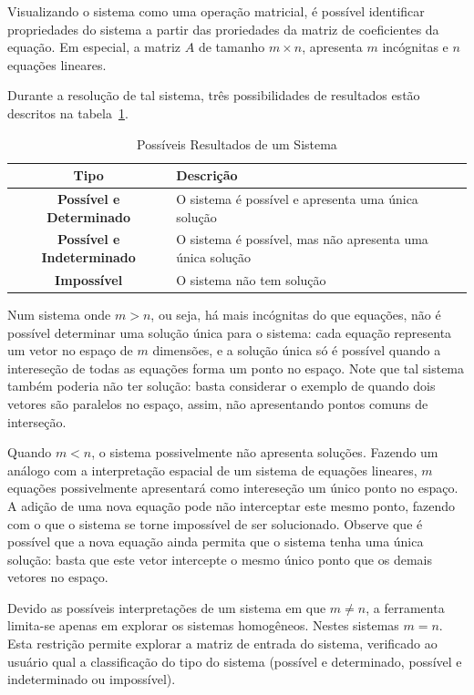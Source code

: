 \documentclass[a4paper,10pt]{report}
\begin{document}
Visualizando o sistema como uma operação matricial, é possível identificar propriedades do sistema a partir das proriedades da matriz de coeficientes da equação. Em especial, a matriz $A$ de tamanho $m \times n$, apresenta $m$ incógnitas e $n$ equações lineares.

Durante a resolução de tal sistema, três possibilidades de resultados estão descritos na tabela~\ref{tab:sistemas}.

\begin{table}[h]
\centering
\caption{Possíveis Resultados de um Sistema}
        \begin{tabular}{|c|p{2in}|}
        \hline
        \textbf{Tipo} & \textbf{Descrição} \\ \hline
        \textbf{Possível e Determinado} & O sistema é possível e apresenta uma única solução \\ \hline
        \textbf{Possível e Indeterminado} & O sistema é possível, mas não apresenta uma única solução \\ \hline
        \textbf{Impossível} & O sistema não tem solução \\ \hline
        \end{tabular}
\label{tab:sistemas}
\end{table} 

Num sistema onde $m > n$, ou seja, há mais incógnitas do que equações, não é possível determinar uma solução única para o sistema: cada equação representa um vetor no espaço de $m$ dimensões, e a solução única só é possível quando a intereseção de todas as equações forma um ponto no espaço. Note que tal sistema também poderia não ter solução: basta considerar o exemplo de quando dois vetores são paralelos no espaço, assim, não apresentando pontos comuns de interseção.

Quando $m < n$, o sistema possivelmente não apresenta soluções. Fazendo um análogo com a interpretação espacial de um sistema de equações lineares, $m$ equações possivelmente apresentará como intereseção um único ponto no espaço. A adição de uma nova equação pode não interceptar este mesmo ponto, fazendo com o que o sistema se torne impossível de ser solucionado. Observe que é possível que a nova equação ainda permita que o sistema tenha uma única solução: basta que este vetor intercepte o mesmo único ponto que os demais vetores no espaço.

Devido as possíveis interpretações de um sistema em que $m \neq n$, a ferramenta limita-se apenas em explorar os sistemas homogêneos. Nestes sistemas $m = n$. Esta restrição permite explorar a matriz de entrada do sistema, verificado ao usuário qual a classificação do tipo do sistema (possível e determinado, possível e indeterminado ou impossível).
\end{document}
